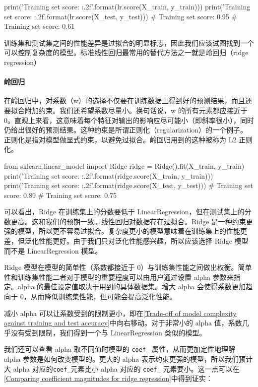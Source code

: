 \begin{pyc}
    print('Training set score: {:.2f}'.format(lr.score(X_train, y_train)))
    print('Training set score: {:.2f}'.format(lr.score(X_test, y_test)))
    # Training set score: 0.95
    # Training set score: 0.61
\end{pyc}
训练集和测试集之间的性能差异是过拟合的明显标志，因此我们应该试图找到一个可以控制复杂度的模型。标准线性回归最常用的替代方法之一就是岭回归（ridge regression）

\paragraph{岭回归} 在岭回归中，对系数（w）的选择不仅要在训练数据上得到好的预测结果，而且还要拟合附加约束。我们还希望系数尽量小。换句话说，w 的所有元素都应接近于 0。直观上来看，这意味着每个特征对输出的影响应尽可能小（即斜率很小），同时仍给出很好的预测结果。这种约束是所谓正则化（regularization）的一个例子。正则化是指对模型做显式约束，以避免过拟合。岭回归用到的这种被称为 L2 正则化。
\begin{pyc}
    from sklearn.linear_model import Ridge
    ridge = Ridge().fit(X_train, y_train)
    print('Training set score: {:.2f}'.format(ridge.score(X_train, y_train)))
    print('Training set score: {:.2f}'.format(ridge.score(X_test, y_test)))
    # Training set score: 0.89
    # Training set score: 0.75
\end{pyc}
可以看出，Ridge 在训练集上的分数要低于 LinearRegression，但在测试集上的分数更高。这和我们的预期一致。线性回归对数据存在过拟合。Ridge 是一种约束更强的模型，所以更不容易过拟合。复杂度更小的模型意味着在训练集上的性能更差，但泛化性能更好。由于我们只对泛化性能感兴趣，所以应该选择 Ridge 模型而不是 LinearRegression 模型。

Ridge 模型在模型的简单性（系数都接近于 0）与训练集性能之间做出权衡。简单性和训练集性能二者对于模型的重要程度可以由用户通过设置 alpha 参数来指定。alpha 的最佳设定值取决于用到的具体数据集。增大 alpha 会使得系数更加趋向于 0，从而降低训练集性能，但可能会提高泛化性能。

减小 alpha 可以让系数受到的限制更小，即在\autoref{Trade-off of model complexity against training and test accuracy}中向右移动。对于非常小的 alpha 值，系数几乎没有受到限制，我们得到一个与 LinearRegression 类似的模型。


我们还可以查看 alpha 取不同值时模型的 \verb|coef_| 属性，从而更加定性地理解 alpha 参数是如何改变模型的。更大的 alpha 表示约束更强的模型，所以我们预计大 alpha 对应的\verb|coef_|元素比小 alpha 对应的 \verb|coef_| 元素要小。这一点可以在\autoref{Comparing coefficient magnitudes for ridge regression}中得到证实：